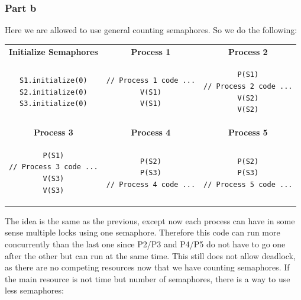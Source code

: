\documentclass[english]{article}
\begin{document}
\subsubsection*{Part b}
Here we are allowed to use general counting semaphores. So we do the following:
\begin{table}[H]
\begin{tabular}{|c|c|c|}
\hline
\textbf{Initialize Semaphores} & \textbf{Process 1} & \textbf{Process 2}  \\

\begin{lstlisting}
S1.initialize(0)
S2.initialize(0)
S3.initialize(0)
\end{lstlisting}
 & 
 \begin{lstlisting}
// Process 1 code ...
V(S1)
V(S1)
\end{lstlisting}
& 
\begin{lstlisting}
P(S1)
// Process 2 code ...
V(S2)
V(S2)
\end{lstlisting} \\ \hline \hline
\textbf{Process 3} & \textbf{Process 4} & \textbf{Process 5} \\

\begin{lstlisting}
P(S1)
// Process 3 code ...
V(S3)
V(S3)
\end{lstlisting}
& 
\begin{lstlisting}
P(S2)
P(S3)
// Process 4 code ...
\end{lstlisting}
&
\begin{lstlisting}
P(S2)
P(S3)
// Process 5 code ...
\end{lstlisting} \\\hline

\end{tabular}
\end{table}

The idea is the same as the previous, except now each process can have in some sense multiple locks using one semaphore.
Therefore this code can run more concurrently than the last one since P2/P3 and P4/P5 do not have to go one after the other but can run at the same time.
This still does not allow deadlock, as there are no competing resources now that we have counting semaphores. If the main resource is not time but number of
semaphores, there is a way to use less semaphores:
\end{document}
